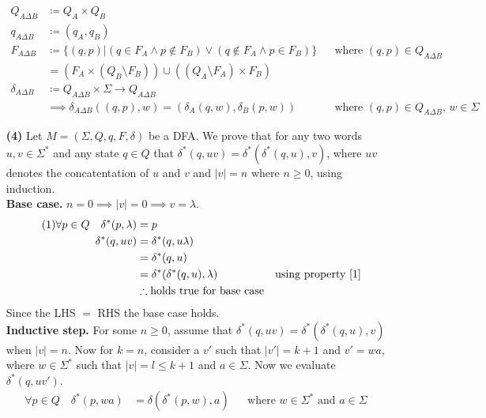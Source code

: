 \documentclass [10pt]{article}
\begin{document}
\begin{enumerate}
	\begin{align}
		Q_{A\Delta B} &\coloneqq Q_{A} \times Q_{B} \nonumber \\
		q_{A\Delta B} &\coloneqq (q_{A},q_{B}) \nonumber \\
		F_{A\Delta B} &\coloneqq \{(q,p)|(q\in F_{A} \land p\notin F_{B})\lor(q\notin F_{A} \land p\in F_{B})\} && \text{where $(q,p) \in Q_{A\Delta B}$} \nonumber \\
		&= (F_{A}\times (Q_{B}\setminus F_{B}))\cup((Q_{A}\setminus F_{A})\times F_{B}) \nonumber \\
		\delta_{A\Delta B} &\coloneqq Q_{A\Delta B} \times \Sigma \rightarrow Q_{A\Delta B} \nonumber \\
		&\implies \delta_{A\Delta B}((q,p),w) = (\delta_{A}(q,w),\delta_{B}(p,w)) && \text{where $(q,p) \in Q_{A\Delta B}$, $w\in \Sigma$} \nonumber 
	\end{align}
	\item[\textbf{(4)}]Let $M=(\Sigma,Q,q,F,\delta)$ be a DFA. We prove that for any two words $u,v \in \Sigma^{*}$ and any state $q \in Q$ that $\delta^{*}(q,uv)=\delta^{*}(\delta^{*}(q,u),v)$, where $uv$ denotes the concatentation of $u$ and $v$ and $\left| v \right| = n$ where $n \ge 0$, using induction.\\
	\textbf{Base case.} $n = 0 \implies \left|v\right| = 0 \implies v = \lambda$.
	\begin{align}
	\label{1} \tag{1} \forall p \in Q \quad \delta^{*}(p,\lambda) &= p\\
	\delta^{*}(q,uv)&=\delta^{*}(q,u\lambda) \nonumber \\
	&=\delta^{*}(q,u) \nonumber \\
	&=\delta^{*}(\delta^{*}(q,u),\lambda) && \text{using property \ref{1}} \nonumber \\ 
	&\therefore \text{holds true for base case} \nonumber
	\end{align}
	Since the LHS $=$ RHS the base case holds.\\
	\textbf{Inductive step.} For some $n \ge 0$, assume that $\delta^{*}(q,uv) = \delta^{*}(\delta^{*}(q,u),v)$ when $\left|v\right| = n$. Now for $k = n$, consider a $v'$ such that $\left|v'\right| = k + 1$ and $v' = wa$, where $w \in \Sigma^{*}$ such that $\left|v\right| = l \le k + 1$ and $a \in \Sigma$. Now we evaluate $\delta^{*}(q,uv')$.
	\begin{align}
	\label{2} \tag{2} \forall p \in Q \quad \delta^{*}(p,wa) &= \delta(\delta^{*}(p,w),a) && \text{where $w \in \Sigma^{*}$ and $a \in \Sigma$}\\

\end{align}
\end{enumerate}
\end{document}

